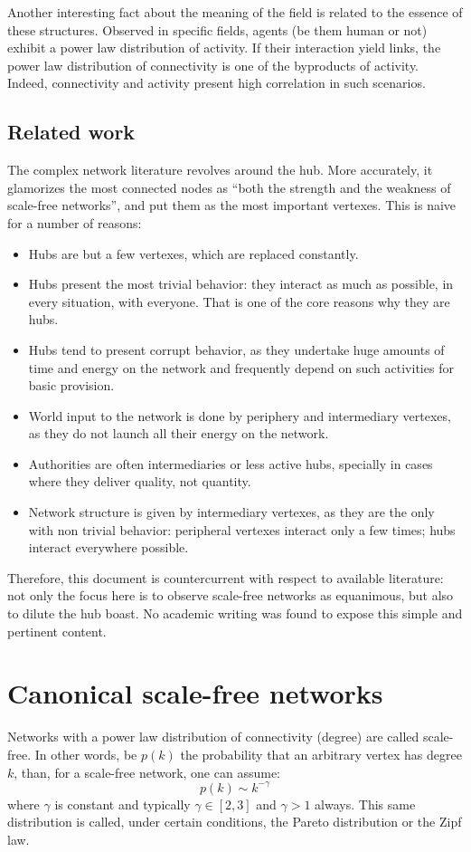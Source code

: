 \documentclass[a4paper, 11pt]{article} %
\begin{document}
Another interesting fact about the meaning of the field is related to the essence of these structures. Observed in specific fields, agents (be them human or not) exhibit a power law distribution of activity. If their interaction yield links, the power law distribution of connectivity is one of the byproducts of activity. Indeed, connectivity and activity present high correlation in such scenarios.

\subsection{Related work}\label{sec:rel}
The complex network literature revolves around the hub. 
More accurately, it glamorizes the most connected nodes as ``both the strength and the weakness of scale-free networks'', and put them as the most important vertexes. This is naive for a number of reasons:
\begin{itemize}
    \item Hubs are but a few vertexes, which are replaced constantly.
    \item Hubs present the most trivial behavior: they interact as much as possible, in every situation, with everyone. That is one of the core reasons why they are hubs.
    \item Hubs tend to present corrupt behavior, as they undertake huge amounts of time and energy on the network and frequently depend on such activities for basic provision.
    \item World input to the network is done by periphery and intermediary vertexes, as they do not launch all their energy on the network.
    \item Authorities are often intermediaries or less active hubs, specially in cases where they deliver quality, not quantity.
    \item Network structure is given by intermediary vertexes, as they are the only with non trivial behavior: peripheral vertexes interact only a few times; hubs interact everywhere possible.
\end{itemize}

Therefore, this document is countercurrent with respect to available literature: not only the focus here is to observe scale-free networks as equanimous, but also to dilute the hub boast. No academic writing was found to expose this simple and pertinent content.

\section{Canonical scale-free networks}\label{sec:can}
Networks with a power law distribution of connectivity (degree) are called scale-free. In other words, be $p(k)$ the probability that an arbitrary vertex has degree $k$, than, for a scale-free network, one can assume:
\begin{equation}
p(k) \sim k^{-\gamma}
\end{equation}
\noindent where $\gamma$ is constant and typically $\gamma \in [2,3]$ and $\gamma > 1$ always. This same distribution is called, under certain conditions, the Pareto distribution or the Zipf law.
\end{document}

